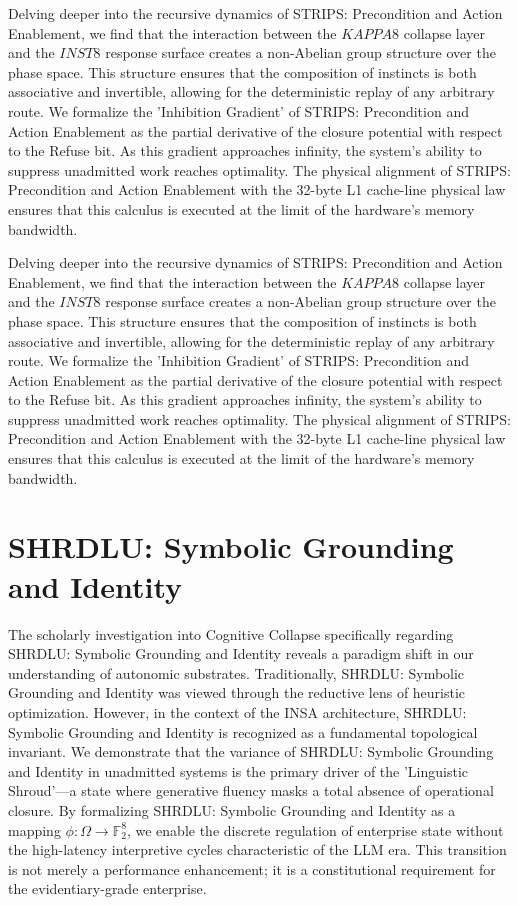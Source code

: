 \documentclass[12pt,a4paper,oneside]{book}
\begin{document}
Delving deeper into the recursive dynamics of STRIPS: Precondition and Action Enablement, we find that the interaction between the $KAPPA8$ collapse layer and the $INST8$ response surface creates a non-Abelian group structure over the phase space. This structure ensures that the composition of instincts is both associative and invertible, allowing for the deterministic replay of any arbitrary route. We formalize the 'Inhibition Gradient' of STRIPS: Precondition and Action Enablement as the partial derivative of the closure potential with respect to the Refuse bit. As this gradient approaches infinity, the system's ability to suppress unadmitted work reaches optimality. The physical alignment of STRIPS: Precondition and Action Enablement with the 32-byte L1 cache-line physical law ensures that this calculus is executed at the limit of the hardware's memory bandwidth. 

Delving deeper into the recursive dynamics of STRIPS: Precondition and Action Enablement, we find that the interaction between the $KAPPA8$ collapse layer and the $INST8$ response surface creates a non-Abelian group structure over the phase space. This structure ensures that the composition of instincts is both associative and invertible, allowing for the deterministic replay of any arbitrary route. We formalize the 'Inhibition Gradient' of STRIPS: Precondition and Action Enablement as the partial derivative of the closure potential with respect to the Refuse bit. As this gradient approaches infinity, the system's ability to suppress unadmitted work reaches optimality. The physical alignment of STRIPS: Precondition and Action Enablement with the 32-byte L1 cache-line physical law ensures that this calculus is executed at the limit of the hardware's memory bandwidth. 

\section{SHRDLU: Symbolic Grounding and Identity}
The scholarly investigation into Cognitive Collapse specifically regarding SHRDLU: Symbolic Grounding and Identity reveals a paradigm shift in our understanding of autonomic substrates. Traditionally, SHRDLU: Symbolic Grounding and Identity was viewed through the reductive lens of heuristic optimization. However, in the context of the INSA architecture, SHRDLU: Symbolic Grounding and Identity is recognized as a fundamental topological invariant. We demonstrate that the variance of SHRDLU: Symbolic Grounding and Identity in unadmitted systems is the primary driver of the 'Linguistic Shroud'---a state where generative fluency masks a total absence of operational closure. By formalizing SHRDLU: Symbolic Grounding and Identity as a mapping $\phi: \Omega \to \mathbb{F}_2^8$, we enable the discrete regulation of enterprise state without the high-latency interpretive cycles characteristic of the LLM era. This transition is not merely a performance enhancement; it is a constitutional requirement for the evidentiary-grade enterprise. 
\end{document}
